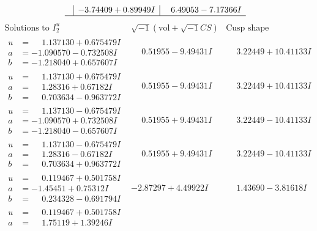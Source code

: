 \documentclass[1p]{elsarticle_modified}
\theoremstyle{definition}
\newcommand{\I}{\sqrt{-1}}
\begin{document}
$$\begin{array}{c|c|c}
 & -3.74409 + 0.89949 I & \phantom{-}6.49053 - 7.17366 I\\
 \hline 
 \end{array}$$\newpage$$\begin{array}{c|c|c}  
\text{Solutions to }I^u_{2}& \I (\text{vol} + \sqrt{-1}CS) & \text{Cusp shape}\\
 \hline 
\begin{aligned}
u &= \phantom{-}1.137130 + 0.675479 I \\
a &= -1.090570 - 0.732508 I \\
b &= -1.218040 + 0.657607 I\end{aligned}
 & \phantom{-}0.51955 - 9.49431 I & \phantom{-}3.22449 + 10.41133 I \\ \hline\begin{aligned}
u &= \phantom{-}1.137130 + 0.675479 I \\
a &= \phantom{-}1.28316 + 0.67182 I \\
b &= \phantom{-}0.703634 - 0.963772 I\end{aligned}
 & \phantom{-}0.51955 - 9.49431 I & \phantom{-}3.22449 + 10.41133 I \\ \hline\begin{aligned}
u &= \phantom{-}1.137130 - 0.675479 I \\
a &= -1.090570 + 0.732508 I \\
b &= -1.218040 - 0.657607 I\end{aligned}
 & \phantom{-}0.51955 + 9.49431 I & \phantom{-}3.22449 - 10.41133 I \\ \hline\begin{aligned}
u &= \phantom{-}1.137130 - 0.675479 I \\
a &= \phantom{-}1.28316 - 0.67182 I \\
b &= \phantom{-}0.703634 + 0.963772 I\end{aligned}
 & \phantom{-}0.51955 + 9.49431 I & \phantom{-}3.22449 - 10.41133 I \\ \hline\begin{aligned}
u &= \phantom{-}0.119467 + 0.501758 I \\
a &= -1.45451 + 0.75312 I \\
b &= \phantom{-}0.234328 - 0.691794 I\end{aligned}
 & -2.87297 + 4.49922 I & \phantom{-}1.43690 - 3.81618 I \\ \hline\begin{aligned}
u &= \phantom{-}0.119467 + 0.501758 I \\
a &= \phantom{-}1.75119 + 1.39246 I \\

\end{aligned}
\end{array}$$
\end{document}
